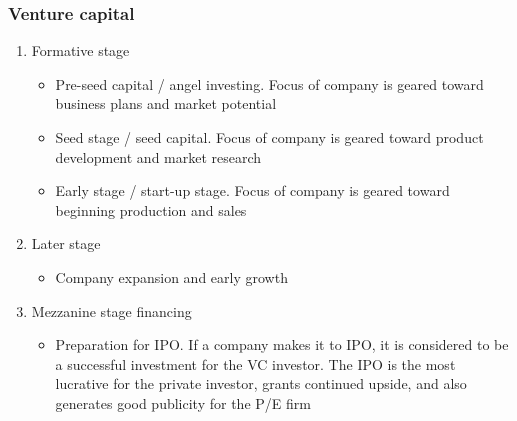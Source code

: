 \documentclass[../notes_compiled.tex]{subfiles}
\begin{document}
\subsubsection{Venture capital}
\begin{enumerate}
\item Formative stage
\begin{itemize}
\item Pre-seed capital / angel investing. Focus of company is geared toward business plans and market potential
\item Seed stage / seed capital. Focus of company is geared toward product development and market research
\item Early stage / start-up stage. Focus of company is geared toward beginning production and sales
\end{itemize}
\item Later stage
\begin{itemize}
\item Company expansion and early growth
\end{itemize}
\item Mezzanine stage financing
\begin{itemize}
\item Preparation for IPO. If a company makes it to IPO, it is considered to be a successful investment for the VC investor. The IPO is the most lucrative for the private investor, grants continued upside, and also generates good publicity for the P/E firm
\end{itemize}
\end{enumerate}
\end{document}

